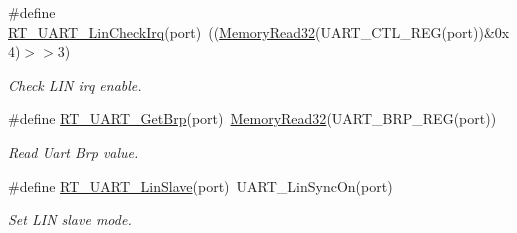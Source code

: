 \begin{DoxyCompactItemize}
\#define \mbox{\hyperlink{a00173_a2e2715198f9716282584f34a7f472649}{R\+T\+\_\+\+U\+A\+R\+T\+\_\+\+Lin\+Check\+Irq}}(port)~((\mbox{\hyperlink{a00068_a2d484dc15bdf30ee11ab3b05f31f0e16}{Memory\+Read32}}(U\+A\+R\+T\+\_\+\+C\+T\+L\+\_\+\+R\+EG(port))\&0x4)$>$$>$3)
\begin{DoxyCompactList}\small\item\em Check L\+IN irq enable. \end{DoxyCompactList}\item 
\#define \mbox{\hyperlink{a00173_a74f1bca1f0b60eeec1f84bcba3e34919}{R\+T\+\_\+\+U\+A\+R\+T\+\_\+\+Get\+Brp}}(port)~\mbox{\hyperlink{a00068_a2d484dc15bdf30ee11ab3b05f31f0e16}{Memory\+Read32}}(U\+A\+R\+T\+\_\+\+B\+R\+P\+\_\+\+R\+EG(port))
\begin{DoxyCompactList}\small\item\em Read Uart Brp value. \end{DoxyCompactList}\item 
\#define \mbox{\hyperlink{a00173_a3f9518fa74ec401803fe1d15e0d39ff2}{R\+T\+\_\+\+U\+A\+R\+T\+\_\+\+Lin\+Slave}}(port)~U\+A\+R\+T\+\_\+\+Lin\+Sync\+On(port)
\begin{DoxyCompactList}\small\item\em Set L\+IN slave mode. \end{DoxyCompactList}\end{DoxyCompactItemize}
